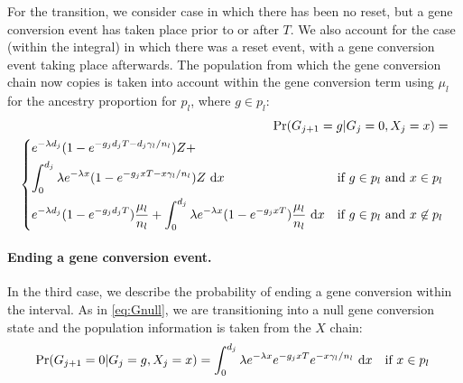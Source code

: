 For the transition, we consider case in which there has been no reset, but a gene conversion event has taken place prior to or after $T$.
We also account for the case (within the integral) in which there was a reset event, with a gene conversion event taking place afterwards.
The population from which the gene conversion chain now copies is taken into account within the gene conversion term using $\mu_l$ for the ancestry proportion for $p_l$, where $g \in p_l$:
%
\begin{equation} 
\begin{split}
    \Pr(G_{j+1}=g|G_{j}=0,X_j=x) =  \\
\begin{dcases}
    e^{-\lambda d_j} (1-e^{-g_j d_j T - d_j \gamma_l / n_l}) Z +  \\
    \int_0^{d_j} \lambda e^{-\lambda x} (1-e^{-g_j x T -x \gamma_l / n_l }) Z ~\mathrm{d}x
    &  \text{if $g \in p_l $ and $x \in p_l $ } \\%
e^{-\lambda d_j} (1-e^{-g_j d_j T }) \frac{\mu_l}{n_l} +  
\int_0^{d_j} \lambda e^{-\lambda x} (1-e^{-g_j x T }) \frac{\mu_l}{n_l} ~\mathrm{d}x
    &  \text{if $g \in p_l $ and $x \not\in p_l $ } \\%
\end{dcases}
\end{split}
\end{equation}

\paragraph{Ending a gene conversion event.}
In the third case, we describe the probability of ending a gene conversion within the interval.  
As in \eqref{eq:Gnull}, we are transitioning into a null gene conversion state and the population information is taken from the $X$ chain:
%
\begin{equation}
    \Pr(G_{j+1}=0|G_{j}=g,X_j=x) = 
    \int_0^{d_j} \lambda e^{-\lambda x} e^{-g_j x T } e^{-x \gamma_l/n_l} ~\mathrm{d}x ~~~
     \text{if $x \in p_l $ } \\%
\end{equation}


